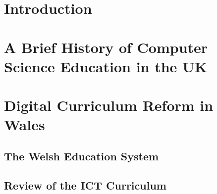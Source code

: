 \documentclass[sigconf]{acmart}
\begin{document}

\maketitle


\section{Introduction}

\section{A Brief History of Computer Science Education in the UK}

\section{Digital Curriculum Reform in Wales}

\subsection{The Welsh Education System}

\subsection{Review of the ICT Curriculum}
\end{document}
